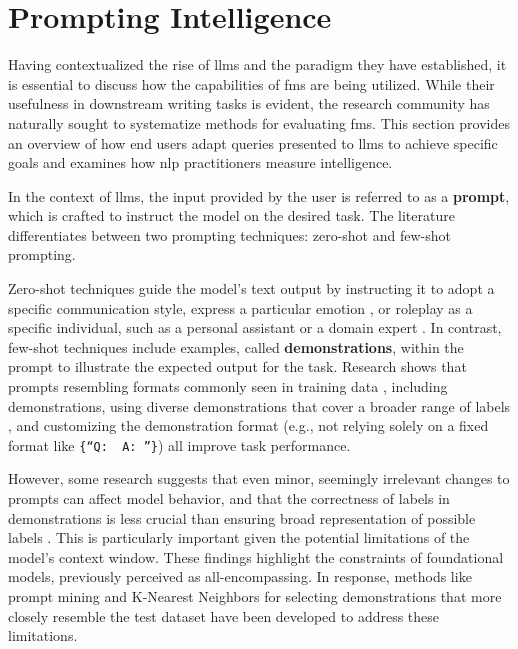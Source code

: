 \section{Prompting Intelligence}

Having contextualized the rise of \glspl{llm} and the paradigm they have established, it is essential to discuss how the capabilities of \glspl{fm} are being utilized. While their usefulness in downstream writing tasks is evident, the research community has naturally sought to systematize methods for evaluating \glspl{fm}. This section provides an overview of how end users adapt queries presented to \glspl{llm} to achieve specific goals and examines how \gls{nlp} practitioners measure intelligence.

\pskip

In the context of \glspl{llm}, the input provided by the user is referred to as a \textbf{prompt}, which is crafted to instruct the model on the desired task. The literature differentiates between two prompting techniques: zero-shot and few-shot prompting.

\pskip

Zero-shot techniques guide the model's text output by instructing it to adopt a specific communication style, express a particular emotion \cite{emotionalstimuli} \cite{boundingcapacities}, or roleplay as a specific individual, such as a personal assistant or a domain expert \cite{roleplaying} \cite{helpfulassistant}. In contrast, few-shot techniques \cite{gpt3} include examples, called \textbf{demonstrations}, within the prompt to illustrate the expected output for the task. Research shows that prompts resembling formats commonly seen in training data \cite{Jiang2020}, including demonstrations, using diverse demonstrations that cover a broader range of labels \cite{su2022selectiveannotationmakeslanguage} \cite{min2020ambigqaansweringambiguousopendomain}, and customizing the demonstration format (e.g., not relying solely on a fixed format like \verb+{“Q:  A: ”}+) \cite{Jiang2020} all improve task performance.

\pskip

However, some research suggests that even minor, seemingly irrelevant changes to prompts can affect model behavior, and that the correctness of labels in demonstrations is less crucial than ensuring broad representation of possible labels \cite{min2020ambigqaansweringambiguousopendomain} \cite{wei2023chainofthoughtpromptingelicitsreasoning}. This is particularly important given the potential limitations of the model's context window. These findings highlight the constraints of foundational models, previously perceived as all-encompassing. In response, methods like prompt mining \cite{Jiang2020} and K-Nearest Neighbors for selecting demonstrations that more closely resemble the test dataset \cite{liu2021makesgoodincontextexamples} have been developed to address these limitations.

